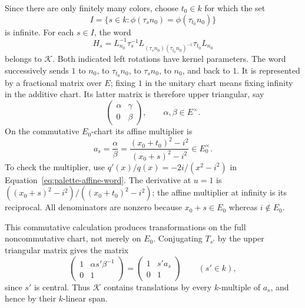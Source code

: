 Since there are only finitely many colors, choose $t_0\in k$ for which
the set
\[
 I=\{s\in k:\phi(\tau_sn_0)=\phi(\tau_{t_0}n_0)\}
\]
is infinite. For each $s\in I$, the word
\begin{equation}\label{eq:palette-affine-word}
 H_s=L_{n_0}^{-1}\tau_s^{-1}
 L_{(\tau_sn_0)(\tau_{t_0}n_0)^{-1}}
 \tau_{t_0}L_{n_0}
\end{equation}
belongs to $\mathcal K$. Both indicated left rotations have kernel
parameters. The word successively sends $1$ to $n_0$, to
$\tau_{t_0}n_0$, to $\tau_sn_0$, to $n_0$, and back to $1$.
It is represented by a fractional matrix over $E$; fixing $1$ in the
unitary chart means fixing infinity in the additive chart. Its latter
matrix is therefore upper triangular, say
\[
 \begin{pmatrix}\alpha&\gamma\\0&\beta\end{pmatrix},
 \qquad\alpha,\beta\in E^\times.
\]
On the commutative $E_0$-chart its affine multiplier is
\begin{equation}\label{eq:palette-affine-multiplier}
 a_s=\frac{\alpha}{\beta}
     =\frac{(x_0+t_0)^2-i^2}{(x_0+s)^2-i^2}\in E_0^\times.
\end{equation}
To check the multiplier, use
$q'(x)/q(x)=-2i/(x^2-i^2)$ in
Equation~\ref{eq:palette-affine-word}. The derivative at $u=1$ is
$((x_0+s)^2-i^2)/((x_0+t_0)^2-i^2)$; the affine multiplier at infinity
is its reciprocal. All denominators are nonzero because
$x_0+s\in E_0$ whereas $i\notin E_0$.

This commutative calculation produces transformations on the full
noncommutative chart, not merely on $E_0$. Conjugating $T_{s'}$ by the
upper triangular matrix gives the matrix
\[
 \begin{pmatrix}1&\alpha s'\beta^{-1}\\0&1\end{pmatrix}
 =\begin{pmatrix}1&s'a_s\\0&1\end{pmatrix}
 \qquad(s'\in k),
\]
since $s'$ is central. Thus $\mathcal K$ contains translations by every
$k$-multiple of $a_s$, and hence by their $k$-linear span.

